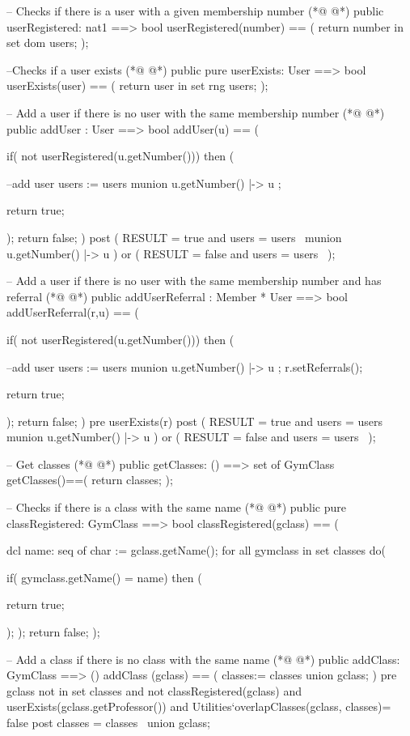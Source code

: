 \begin{vdmpp}[breaklines=true]
  -- Checks if there is a user with a given membership number
(*@
\label{userRegistered:74}
@*)
  public userRegistered: nat1 ==> bool
  userRegistered(number) == (
    return number in set dom users;
  );
  
  --Checks if a user exists
(*@
\label{userExists:80}
@*)
  public pure userExists: User ==> bool
  userExists(user) == (
    return user in set rng users;
  );
  
  -- Add a user if there is no user with the same membership number
(*@
\label{addUser:86}
@*)
  public addUser : User ==> bool
  addUser(u) == (
   
   if( not userRegistered(u.getNumber())) then (
     
     --add user 
     users := users munion { u.getNumber() |-> u };
    
    return true;
   
   ); 
   return false;
  ) 
  post ( RESULT = true and users = users~ munion { u.getNumber() |-> u } ) or ( RESULT = false and users = users~ ); 
  
  -- Add a user if there is no user with the same membership number and has referral
(*@
\label{addUserReferral:102}
@*)
  public addUserReferral : Member * User ==> bool
  addUserReferral(r,u) == (
   
   if( not userRegistered(u.getNumber())) then (
     
     --add user 
     users := users munion { u.getNumber() |-> u };
     r.setReferrals();
    
    return true;
   
   ); 
   return false;
  ) 
 pre userExists(r)
  post ( RESULT = true and users = users~ munion { u.getNumber() |-> u } ) or ( RESULT = false and users = users~ ); 


 -- Get classes
(*@
\label{getClasses:121}
@*)
 public getClasses: () ==> set of GymClass
 getClasses()==(
  return classes;
 );
 
 -- Checks if there is a class with the same name
(*@
\label{classRegistered:127}
@*)
 public pure classRegistered: GymClass ==> bool
 classRegistered(gclass) == (
  
  dcl name: seq of char := gclass.getName();
  for all gymclass in set classes do(
  
   if( gymclass.getName() = name) then (
    
    return true;
    
   );
  );
  return false;
 );
 
 -- Add a class if there is no class with the same name
(*@
\label{addClass:143}
@*)
 public addClass: GymClass ==> ()
 addClass (gclass) == (
  classes:= classes union {gclass};
 )
 pre gclass not in set classes 
  and not classRegistered(gclass) 
  and userExists(gclass.getProfessor()) 
  and Utilities`overlapClasses(gclass, classes)= false
 post classes = classes~ union {gclass};
 

\end{vdmpp}
